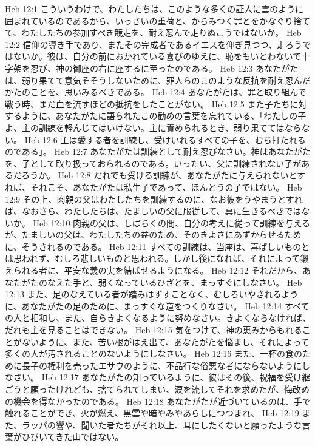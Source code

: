 Heb 12:1  こういうわけで、わたしたちは、このような多くの証人に雲のように囲まれているのであるから、いっさいの重荷と、からみつく罪とをかなぐり捨てて、わたしたちの参加すべき競走を、耐え忍んで走りぬこうではないか。
Heb 12:2  信仰の導き手であり、またその完成者であるイエスを仰ぎ見つつ、走ろうではないか。彼は、自分の前におかれている喜びのゆえに、恥をもいとわないで十字架を忍び、神の御座の右に座するに至ったのである。
Heb 12:3  あなたがたは、弱り果てて意気そそうしないために、罪人らのこのような反抗を耐え忍んだかたのことを、思いみるべきである。
Heb 12:4  あなたがたは、罪と取り組んで戦う時、まだ血を流すほどの抵抗をしたことがない。
Heb 12:5  また子たちに対するように、あなたがたに語られたこの勧めの言葉を忘れている、「わたしの子よ、主の訓練を軽んじてはいけない。主に責められるとき、弱り果ててはならない。
Heb 12:6  主は愛する者を訓練し、受けいれるすべての子を、むち打たれるのである」。
Heb 12:7  あなたがたは訓練として耐え忍びなさい。神はあなたがたを、子として取り扱っておられるのである。いったい、父に訓練されない子があるだろうか。
Heb 12:8  だれでも受ける訓練が、あなたがたに与えられないとすれば、それこそ、あなたがたは私生子であって、ほんとうの子ではない。
Heb 12:9  その上、肉親の父はわたしたちを訓練するのに、なお彼をうやまうとすれば、なおさら、わたしたちは、たましいの父に服従して、真に生きるべきではないか。
Heb 12:10  肉親の父は、しばらくの間、自分の考えに従って訓練を与えるが、たましいの父は、わたしたちの益のため、そのきよさにあずからせるために、そうされるのである。
Heb 12:11  すべての訓練は、当座は、喜ばしいものとは思われず、むしろ悲しいものと思われる。しかし後になれば、それによって鍛えられる者に、平安な義の実を結ばせるようになる。
Heb 12:12  それだから、あなたがたのなえた手と、弱くなっているひざとを、まっすぐにしなさい。
Heb 12:13  また、足のなえている者が踏みはずすことなく、むしろいやされるように、あなたがたの足のために、まっすぐな道をつくりなさい。
Heb 12:14  すべての人と相和し、また、自らきよくなるように努めなさい。きよくならなければ、だれも主を見ることはできない。
Heb 12:15  気をつけて、神の恵みからもれることがないように、また、苦い根がはえ出て、あなたがたを悩まし、それによって多くの人が汚されることのないようにしなさい。
Heb 12:16  また、一杯の食のために長子の権利を売ったエサウのように、不品行な俗悪な者にならないようにしなさい。
Heb 12:17  あなたがたの知っているように、彼はその後、祝福を受け継ごうと願ったけれども、捨てられてしまい、涙を流してそれを求めたが、悔改めの機会を得なかったのである。
Heb 12:18  あなたがたが近づいているのは、手で触れることができ、火が燃え、黒雲や暗やみやあらしにつつまれ、
Heb 12:19  また、ラッパの響や、聞いた者たちがそれ以上、耳にしたくないと願ったような言葉がひびいてきた山ではない。
